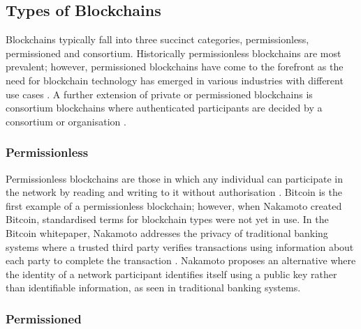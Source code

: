 \subsection{Types of Blockchains}

Blockchains typically fall into three succinct categories, permissionless, permissioned and consortium. Historically permissionless blockchains are most prevalent; however, permissioned blockchains have come to the forefront as the need for blockchain technology has emerged in various industries with different use cases \autocite{yagaBlockchainTechnologyOverview2018}. A further extension of private or permissioned blockchains is consortium blockchains where authenticated participants are decided by a consortium or organisation \autocite{leibleReviewBlockchainTechnology2019}.

\subsubsection{Permissionless}

Permissionless blockchains are those in which any individual can participate in the network by reading and writing to it without authorisation \autocite{yagaBlockchainTechnologyOverview2018}.
Bitcoin is the first example of a permissionless blockchain; however, when Nakamoto created Bitcoin, standardised terms for blockchain types were not yet in use. In the Bitcoin whitepaper, Nakamoto addresses the privacy of traditional banking systems where a trusted third party verifies transactions using information about each party to complete the transaction \autocite{nakamotoBitcoinPeertoPeerElectronic2008}. Nakamoto proposes an alternative where the identity of a network participant identifies itself using a public key rather than identifiable information, as seen in traditional banking systems. 

\subsubsection{Permissioned}


